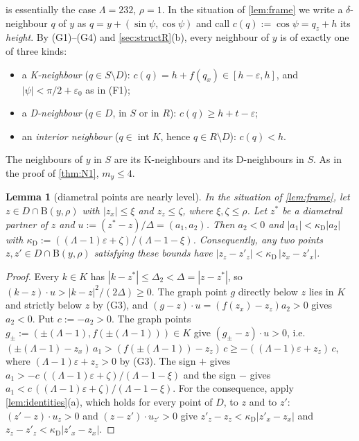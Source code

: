 \documentclass[11pt]{amsart}
\newtheorem{lemma}[theorem]{Lemma}
\theoremstyle{definition}
\theoremstyle{remark}
\newcommand{\Dt}{\Delta_2}
\newcommand{\eps}{\varepsilon}
\newcommand{\Dd}{\mathrm{B}}      %
\begin{document}
 is essentially the case $\Lambda=232$, $\rho=1$. In the situation of \cref{lem:frame} we write a $\delta$-neighbour $q$ of $y$ as $q=y+(\sin\psi,\cos\psi)$ and call $c(q):=\cos\psi=q_z+h$ its \emph{height}. By (G1)--(G4) and \cref{sec:structR}(b), every neighbour of $y$ is of exactly one of three kinds:
\begin{itemize}[leftmargin=2em]
\item a \emph{K-neighbour} ($q\in S\setminus D$): $c(q)=h+f(q_x)\in[h-\eps,h]$, and $|\psi|<\pi/2+\eps_0$ as in (F1);
\item a \emph{D-neighbour} ($q\in D$, in $S$ or in $R$): $c(q)\ge h+t-\eps$;
\item an \emph{interior neighbour} ($q\in\operatorname{int}K$, hence $q\in R\setminus D$): $c(q)<h$.
\end{itemize}
The neighbours of $y$ in $S$ are its K-neighbours and its D-neighbours in $S$. As in the proof of \cref{thm:N1}, $m_y\le4$.

\begin{lemma}[diametral points are nearly level]\label{lem:DN}
In the situation of \cref{lem:frame}, let $z\in D\cap\Dd(y,\rho)$ with $|z_x|\le\xi$ and $z_z\le\zeta$, where $\xi,\zeta\le\rho$. Let $z^*$ be a diametral partner of $z$ and $u:=(z^*-z)/\Delta=(a_1,a_2)$. Then $a_2<0$ and $|a_1|<\kappa_{\mathrm D}|a_2|$ with $\kappa_{\mathrm D}:=((\Lambda-1)\eps+\zeta)/(\Lambda-1-\xi)$. Consequently, any two points $z,z'\in D\cap\Dd(y,\rho)$ satisfying these bounds have $|z_z-z'_z|<\kappa_{\mathrm D}\,|z_x-z'_x|$.
\end{lemma}
\begin{proof}
Every $k\in K$ has $|k-z^*|\le\Dt<\Delta=|z-z^*|$, so $(k-z)\cdot u>|k-z|^2/(2\Delta)\ge0$. The graph point $g$ directly below $z$ lies in $K$ and strictly below $z$ by (G3), and $(g-z)\cdot u=(f(z_x)-z_z)a_2>0$ gives $a_2<0$. Put $c:=-a_2>0$. The graph points $g_\pm:=(\pm(\Lambda-1),f(\pm(\Lambda-1)))\in K$ give $(g_\pm-z)\cdot u>0$, i.e.\ $(\pm(\Lambda-1)-z_x)\,a_1>(f(\pm(\Lambda-1))-z_z)\,c\ge-((\Lambda-1)\eps+z_z)\,c$, where $(\Lambda-1)\eps+z_z>0$ by (G3). The sign $+$ gives $a_1>-c\,((\Lambda-1)\eps+\zeta)/(\Lambda-1-\xi)$ and the sign $-$ gives $a_1<c\,((\Lambda-1)\eps+\zeta)/(\Lambda-1-\xi)$. For the consequence, apply \cref{lem:identities}(a), which holds for every point of $D$, to $z$ and to $z'$: $(z'-z)\cdot u_z>0$ and $(z-z')\cdot u_{z'}>0$ give $z'_z-z_z<\kappa_{\mathrm D}|z'_x-z_x|$ and $z_z-z'_z<\kappa_{\mathrm D}|z'_x-z_x|$.
\end{proof}
\end{document}
